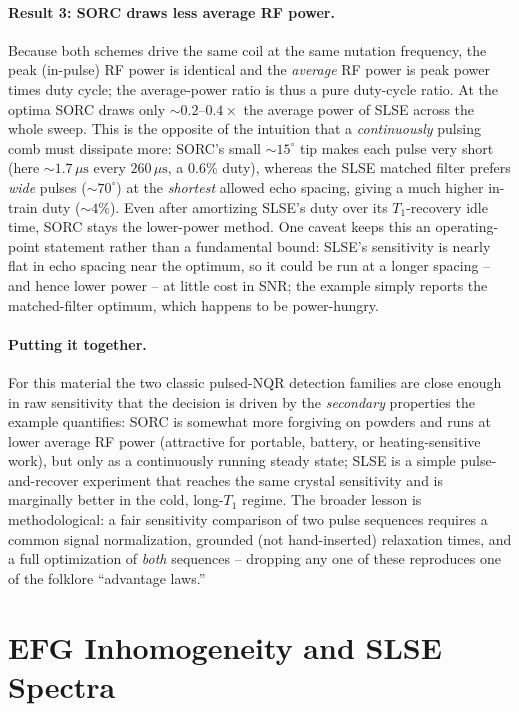 \documentclass[11pt,oneside]{report}
\begin{document}
\paragraph{Result 3: SORC draws less average RF power.}
Because both schemes drive the same coil at the same nutation frequency, the peak
(in-pulse) RF power is identical and the \emph{average} RF power is peak power
times duty cycle; the average-power ratio is thus a pure duty-cycle ratio. At the
optima SORC draws only \(\sim 0.2\text{--}0.4\times\) the average power of SLSE
across the whole sweep. This is the opposite of the intuition that a
\emph{continuously} pulsing comb must dissipate more: SORC's small \(\sim
15^\circ\) tip makes each pulse very short (here \(\sim 1.7\,\mu\mathrm{s}\) every
\(260\,\mu\mathrm{s}\), a \(0.6\%\) duty), whereas the SLSE matched filter prefers
\emph{wide} pulses (\(\sim 70^\circ\)) at the \emph{shortest} allowed echo spacing,
giving a much higher in-train duty (\(\sim 4\%\)). Even after amortizing SLSE's
duty over its \(T_1\)-recovery idle time, SORC stays the lower-power method. One
caveat keeps this an operating-point statement rather than a fundamental bound:
SLSE's sensitivity is nearly flat in echo spacing near the optimum, so it could be
run at a longer spacing -- and hence lower power -- at little cost in SNR; the
example simply reports the matched-filter optimum, which happens to be
power-hungry.

\paragraph{Putting it together.}
For this material the two classic pulsed-NQR detection families are close enough
in raw sensitivity that the decision is driven by the \emph{secondary}
properties the example quantifies: SORC is somewhat more forgiving on powders and
runs at lower average RF power (attractive for portable, battery, or
heating-sensitive work), but only as a continuously running steady state; SLSE is
a simple pulse-and-recover experiment that reaches the same crystal sensitivity
and is marginally better in the cold, long-\(T_1\) regime. The broader lesson is
methodological: a fair sensitivity comparison of two pulse sequences requires a
common signal normalization, grounded (not hand-inserted) relaxation times, and a
full optimization of \emph{both} sequences -- dropping any one of these reproduces
one of the folklore ``advantage laws.''

\section{EFG Inhomogeneity and SLSE Spectra}
\end{document}
